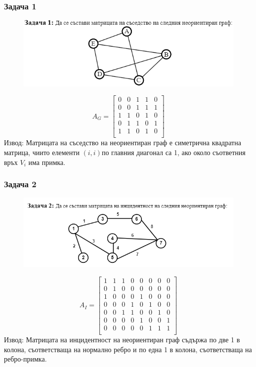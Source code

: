 \documentclass[fleqn, 12pt]{article}
\theoremstyle{definition}
\begin{document}
\subsubsection*{Задача 1}
\begin{figure} [htp!]
\includegraphics[width = \linewidth]{Pics/Discrete math/ex8/ex8-task1.png}
\end{figure}
$$A_G = 
\begin{bmatrix}
0 & 0 & 1 & 1 & 0 \\
0 & 0 & 1 & 1 & 1 \\
1 & 1 & 0 & 1 & 0 \\
0 & 1 & 1 & 0 & 1 \\
1 & 1 & 0 & 1 & 0 \\
\end{bmatrix}
$$
Извод: Матрицата на съседство на неориентиран граф е симетрична квадратна матрица, чиито елементи $(i,i)$по главния диагонал са 1, ако около съответния връх $V_i$ има примка.
\subsubsection*{Задача 2}
\begin{figure} [htp!]
\includegraphics[width = \linewidth]{Pics/Discrete math/ex8/ex8-task2.png}
\end{figure}
$$A_I = 
\begin{bmatrix}
1 & 1 & 1 & 0 & 0 & 0 & 0 & 0 \\
0 & 1 & 0 & 0 & 0 & 0 & 0 & 0 \\
1 & 0 & 0 & 0 & 1 & 0 & 0 & 0 \\
0 & 0 & 0 & 1 & 0 & 1 & 0 & 0 \\
0 & 0 & 1 & 1 & 0 & 0 & 1 & 0 \\
0 & 0 & 0 & 0 & 1 & 0 & 0 & 1 \\
0 & 0 & 0 & 0 & 0 & 1 & 1 & 1 \\
\end{bmatrix}
$$
Извод: Матрицата на инцидентност на неориентиран граф съдържа по две 1 в колона, съответстваща на нормално ребро и по една 1 в колона, съответстваща на ребро-примка.
\end{document}
